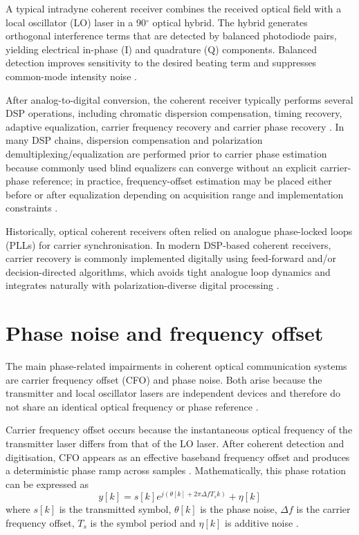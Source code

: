 A typical intradyne coherent receiver combines the received optical field with a local
oscillator (LO) laser in a 90$^\circ$ optical hybrid. The hybrid generates orthogonal
interference terms that are detected by balanced photodiode pairs, yielding electrical
in-phase (I) and quadrature (Q) components. Balanced detection improves sensitivity to the
desired beating term and suppresses common-mode intensity noise \cite{Savory2010JSTQE,Kikuchi2016JLT}.

After analog-to-digital conversion, the coherent receiver typically performs several DSP
operations, including chromatic dispersion compensation, timing recovery, adaptive
equalization, carrier frequency recovery and carrier phase recovery \cite{Savory2010JSTQE,Kuschnerov2009JLT}.
In many DSP chains, dispersion compensation and polarization demultiplexing/equalization
are performed prior to carrier phase estimation because commonly used blind equalizers can
converge without an explicit carrier-phase reference; in practice, frequency-offset
estimation may be placed either before or after equalization depending on acquisition range
and implementation constraints \cite{Savory2010JSTQE,Kuschnerov2009JLT}.

Historically, optical coherent receivers often relied on analogue phase-locked loops (PLLs)
for carrier synchronisation. In modern DSP-based coherent receivers, carrier recovery is
commonly implemented digitally using feed-forward and/or decision-directed algorithms,
which avoids tight analogue loop dynamics and integrates naturally with polarization-diverse
digital processing \cite{Savory2010JSTQE,IpKahn2007JLT,Pfau2009JLT}.

\section{Phase noise and frequency offset}
The main phase-related impairments in coherent optical communication systems are carrier
frequency offset (CFO) and phase noise. Both arise because the transmitter and local
oscillator lasers are independent devices and therefore do not share an identical optical
frequency or phase reference \cite{Kikuchi2016JLT}.

Carrier frequency offset occurs because the instantaneous optical frequency of the
transmitter laser differs from that of the LO laser. After coherent detection and
digitisation, CFO appears as an effective baseband frequency offset and produces a
deterministic phase ramp across samples \cite{Kikuchi2016JLT,Leven2007LPT}. Mathematically,
this phase rotation can be expressed as
\begin{equation}
y[k] = s[k] e^{j(\theta[k] + 2\pi \Delta f T_s k)} + \eta[k]
\end{equation}
where $s[k]$ is the transmitted symbol, $\theta[k]$ is the phase noise, $\Delta f$ is the
carrier frequency offset, $T_s$ is the symbol period and $\eta[k]$ is additive noise
\cite{Kikuchi2016JLT,RoudasCoherentSystems}.

